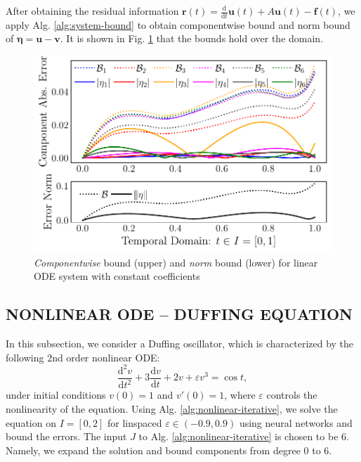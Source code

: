 \documentclass{uai2023}
\newcommand{\vect}[1]{\mathbf{#1}}
\newcommand{\Err}{\eta}
\begin{document}
    After obtaining the residual information {\small $\vect{r}(t)=\frac{\mathrm d}{\mathrm d t}\vect{u}(t) + A\vect{u}(t) - \vect{f}(t)$}, we apply Alg. \ref{alg:system-bound} to obtain componentwise bound and norm bound of {\small $\pmb{\Err} = \vect{u}-\vect{v}$}. 
    It is shown in Fig. \ref{fig:system-bound} that the bounds hold over the domain.

    \begin{figure}[!ht]
        \centering
        \includegraphics[width=\linewidth]{assets/system-bound.pdf}
        \caption{\small \textit{Componentwise} bound (upper) and \textit{norm} bound (lower) for linear ODE system with constant coefficients}\label{fig:system-bound}
    \end{figure}

\subsection{NONLINEAR ODE -- DUFFING EQUATION} \label{section:experiment-duffing}
    In this subsection, we consider a Duffing oscillator, which is characterized by the following $2$nd order nonlinear ODE:
    {
        \begin{equation}\label{eq:duffing}
            \frac{\mathrm{d}^2 v}{\mathrm{d}t^2} + 3 \frac{\mathrm{d}v}{\mathrm{d}t} + 2v +\varepsilon v^3 = \cos t ,
        \end{equation}
    }
    under initial conditions $v(0) = 1$ and $v'(0) = 1$, where $\varepsilon$ controls the nonlinearity of the equation. 
    Using Alg. \ref{alg:nonlinear-iterative}, we solve the equation on $I=[0, 2]$ for linspaced $\varepsilon \in (-0.9, 0.9)$ using neural networks and bound the errors. 
    The input $J$ to Alg. \ref{alg:nonlinear-iterative} is chosen to be $6$. 
    Namely, we expand the solution and bound components from degree $0$ to $6$.
\end{document}
